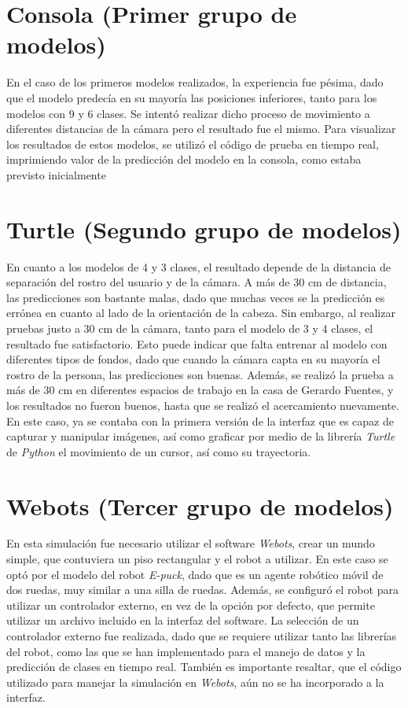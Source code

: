 \section{Consola (Primer grupo de modelos)}
En el caso de los primeros modelos realizados, la experiencia fue pésima, dado que el modelo predecía en su mayoría las posiciones inferiores, tanto para los modelos con 9 y 6 clases. Se intentó realizar dicho proceso de movimiento a diferentes distancias de la cámara pero el resultado fue el mismo. Para visualizar los resultados de estos modelos, se utilizó el código de prueba en tiempo real, imprimiendo valor de la predicción del modelo en la consola, como estaba previsto inicialmente

\section{Turtle (Segundo grupo de modelos)}
En cuanto a los modelos de 4 y 3 clases, el resultado depende de la distancia de separación del rostro del usuario y de la cámara. A más de 30 cm de distancia, las predicciones son bastante malas, dado que muchas veces se la predicción es errónea en cuanto al lado de la orientación de la cabeza. Sin embargo, al realizar pruebas justo a 30 cm de la cámara, tanto para el modelo de 3 y 4 clases, el resultado fue satisfactorio. Esto puede indicar que falta entrenar al modelo con diferentes tipos de fondos, dado que cuando la cámara capta en su mayoría el rostro de la persona, las predicciones son buenas. Además, se realizó la prueba a más de 30 cm en diferentes espacios de trabajo en la casa de Gerardo Fuentes, y los resultados no fueron buenos, hasta que se realizó el acercamiento nuevamente. En este caso, ya se contaba con la primera versión de la interfaz que es capaz de capturar y manipular imágenes, así como graficar por medio de la librería \textit{Turtle} de \textit{Python} el movimiento de un cursor, así como su trayectoria. 
 
\section{Webots (Tercer grupo de modelos)}
En esta simulación fue necesario utilizar el software \textit{Webots}, crear un mundo simple, que contuviera un piso rectangular y el robot a utilizar. En este caso se optó por el modelo del robot \textit{E-puck}, dado que es un agente robótico móvil de dos ruedas, muy similar a una silla de ruedas. Además, se configuró el robot para utilizar un controlador externo, en vez de la opción por defecto, que permite utilizar un archivo incluido en la interfaz del software. La selección de un controlador externo fue realizada, dado que se requiere utilizar tanto las librerías del robot, como las que se han implementado para el manejo de datos y la predicción de clases en tiempo real. También es importante resaltar, que el código utilizado para manejar la simulación en \textit{Webots}, aún no se ha incorporado a la interfaz. 

